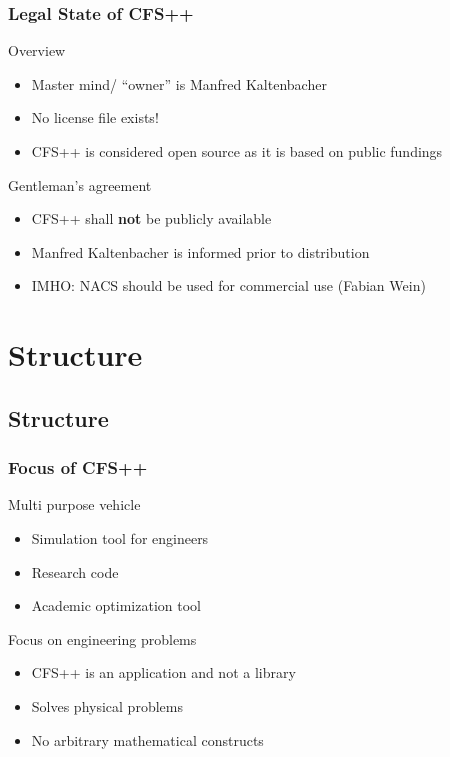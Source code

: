 \documentclass{beamer}
\begin{document}
\begin{frame}
\frametitle{Legal State of CFS++}
Overview
\begin{itemize}
  \item Master mind/ ``owner'' is Manfred Kaltenbacher
  \item No license file exists!
  \item CFS++ is considered open source as it is based on public fundings
\end{itemize}

Gentleman's agreement
\begin{itemize}
  \item CFS++ shall \textbf{not} be publicly available
  \item Manfred Kaltenbacher is informed prior to distribution
  \item IMHO: NACS should be used for commercial use (Fabian Wein)
\end{itemize} 
\end{frame}

\section{Structure}

\subsection{Structure}

\begin{frame}
\frametitle{Focus of CFS++}
Multi purpose vehicle
\begin{itemize}
  \item Simulation tool for engineers
  \item Research code
  \item Academic optimization tool
\end{itemize}
Focus on engineering problems
\begin{itemize}
  \item CFS++ is an application and not a library
  \item Solves physical problems
  \item No arbitrary mathematical constructs
\end{itemize}
\end{frame}
\end{document}
